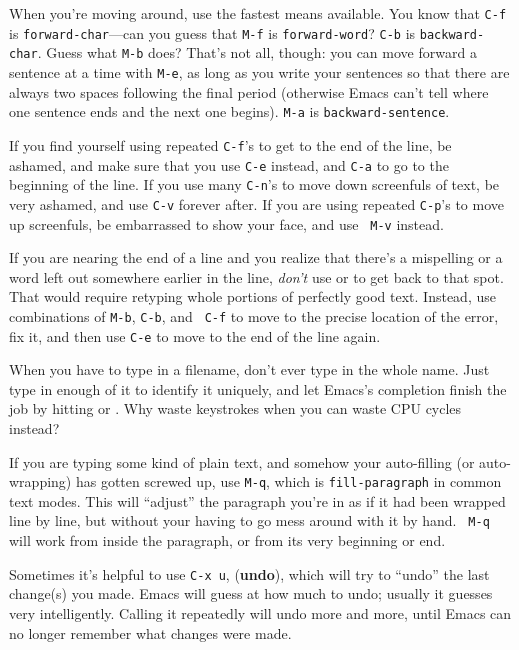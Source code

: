         When you're moving around, use the fastest means available.
You know that {\tt C-f} is {\tt forward-char}---can you guess that
{\tt M-f} is {\tt forward-word}?  {\tt C-b} is {\tt backward-char}.
Guess what {\tt M-b} does?  That's not all, though: you can move
forward a sentence at a time with {\tt M-e}, as long as you write
your sentences so that there are always two spaces following the final
period (otherwise Emacs can't tell where one sentence ends and the
next one begins).  {\tt M-a} is {\tt backward-sentence}.

        If you find yourself using repeated {\tt C-f}'s to get to the
end of the line, be ashamed, and make sure that you use {\tt C-e}
instead, and {\tt C-a} to go to the beginning of the line.  If you use
many {\tt C-n}'s to move down screenfuls of text, be very ashamed, and
use {\tt C-v} forever after.  If you are using repeated {\tt C-p}'s to
move up screenfuls, be embarrassed to show your face, and use {\tt
M-v} instead.

        If you are nearing the end of a line and you realize that
there's a mispelling or a word left out somewhere earlier in the line,
{\em don't} use  or  to get back to that
spot.  That would require retyping whole portions of perfectly good
text.  Instead, use combinations of {\tt M-b}, {\tt C-b}, and {\tt
C-f} to move to the precise location of the error, fix it, and then
use {\tt C-e} to move to the end of the line again.

        When you have to type in a filename, don't ever type in the
whole name.  Just type in enough of it to identify it uniquely, and
let Emacs's completion finish the job by hitting  or
.  Why waste keystrokes when you can waste CPU cycles
instead?

        If you are typing some kind of plain text, and somehow your
auto-filling (or auto-wrapping) has gotten screwed up, use {\tt M-q},
which is {\tt fill-paragraph} in common text modes.  This will
``adjust'' the paragraph you're in as if it had been wrapped line by
line, but without your having to go mess around with it by hand.  {\tt
M-q} will work from inside the paragraph, or from its very beginning
or end.

Sometimes it's helpful to use {\tt C-x~u}, ({\bf undo}), which will
try to ``undo'' the last change(s) you made.  Emacs will guess at how
much to undo; usually it guesses very intelligently.  Calling it
repeatedly will undo more and more, until Emacs can no longer remember
what changes were made.

